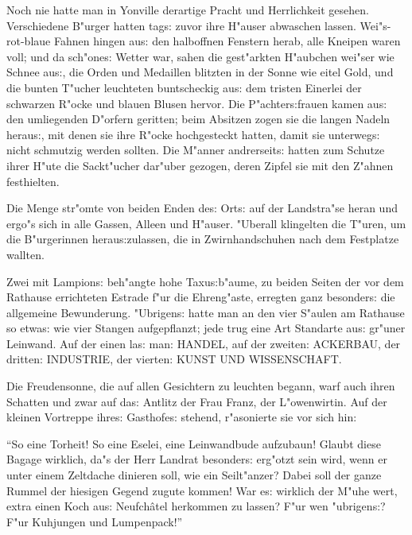 \documentclass[oneside,12pt]{book}
\newenvironment{antiqua}{\normalfont}{}%
\newcommand{\s}{s:}%
\begin{document}
Noch nie hatte man in Yonville derartige Pracht und Herrlichkeit
gesehen. Verschiedene B"urger hatten tag{\s} zuvor ihre H"auser
abwaschen lassen. Wei"s-rot-blaue Fahnen hingen au{\s} den
halboffnen Fenstern herab, alle Kneipen waren voll; und da
sch"one{\s} Wetter war, sahen die gest"arkten H"aubchen wei"ser
wie Schnee au{\s}, die Orden und Medaillen blitzten in der Sonne
wie eitel Gold, und die bunten T"ucher leuchteten buntscheckig
au{\s} dem tristen Einerlei der schwarzen R"ocke und blauen Blusen
hervor. Die P"achter{\s}frauen kamen au{\s} den umliegenden
D"orfern geritten; beim Absitzen zogen sie die langen Nadeln
herau{\s}, mit denen sie ihre R"ocke hochgesteckt hatten, damit
sie unterweg{\s} nicht schmutzig werden sollten. Die M"anner
andrerseit{\s} hatten zum Schutze ihrer H"ute die Sackt"ucher
dar"uber gezogen, deren Zipfel sie mit den Z"ahnen festhielten.

Die Menge str"omte von beiden Enden de{\s} Ort{\s} auf der
Landstra"se heran und ergo"s sich in alle Gassen, Alleen und
H"auser. "Uberall klingelten die T"uren, um die B"urgerinnen
herau{\s}zulassen, die in Zwirnhandschuhen nach dem Festplatze
wallten.

Zwei mit Lampion{\s} beh"angte hohe Taxu{\s}b"aume, zu beiden
Seiten der vor dem Rathause errichteten Estrade f"ur die
Ehreng"aste, erregten ganz besonder{\s} die allgemeine
Bewunderung. "Ubrigen{\s} hatte man an den vier S"aulen am
Rathause so etwa{\s} wie vier Stangen aufgepflanzt; jede trug eine
Art Standarte au{\s} gr"uner Leinwand. Auf der einen la{\s} man:
\begin{antiqua}HANDEL,\end{antiqua} auf der zweiten: \begin{antiqua}ACKERBAU,\end{antiqua} der dritten: \begin{antiqua}INDUSTRIE,\end{antiqua} der
vierten: \begin{antiqua}KUNST UND WISSENSCHAFT.\end{antiqua}

Die Freudensonne, die auf allen Gesichtern zu leuchten begann,
warf auch ihren Schatten und zwar auf da{\s} Antlitz der Frau
Franz, der L"owenwirtin. Auf der kleinen Vortreppe ihre{\s}
Gasthofe{\s} stehend, r"asonierte sie vor sich hin:

"`So eine Torheit! So eine Eselei, eine Leinwandbude aufzubaun!
Glaubt diese Bagage wirklich, da"s der Herr Landrat besonder{\s}
erg"otzt sein wird, wenn er unter einem Zeltdache dinieren soll,
wie ein Seilt"anzer? Dabei soll der ganze Rummel der hiesigen
Gegend zugute kommen! War e{\s} wirklich der M"uhe wert, extra
einen Koch au{\s} Neufch\^atel herkommen zu lassen? F"ur wen
"ubrigen{\s}? F"ur Kuhjungen und Lumpenpack!"'
\end{document}
